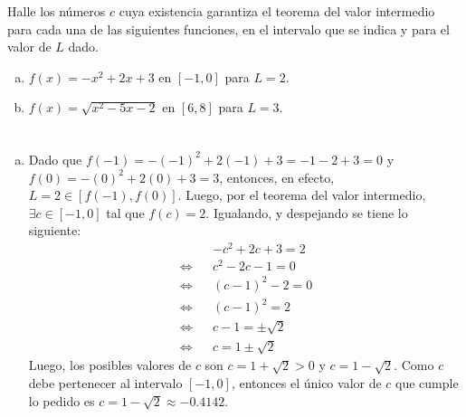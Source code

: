 \begin{enunciado}
 Halle los n\'umeros $c$ cuya existencia garantiza el teorema del valor intermedio para cada una de las siguientes funciones, en el intervalo que se indica y para el valor de $L$ dado.
 \begin{enumerate}[(a)]
  \item $f(x) = -x^2 +2x +3$ en $[-1,0]$ para $L=2$.
  
  \item $f(x)=\sqrt{x^2 -5x -2}$ en $[6,8]$ para $L=3$.
 \end{enumerate}
\end{enunciado}

\begin{solucion}
 $\phantom{0}$
 \begin{enumerate}[(a)]
  \item Dado que $f(-1) = -(-1)^2 + 2(-1) + 3 = -1-2+3 = 0$ y $f(0) = -(0)^2 + 2(0) + 3 = 3$, entonces, en efecto, $L = 2 \in [f(-1), f(0)]$. Luego, por el teorema del valor intermedio, $\exists c \in [-1,0]$ tal que $f(c) = 2$. Igualando, y despejando se tiene lo siguiente:
  \begin{eqnarray*}
   & & -c^2 + 2c + 3 = 2 \\
   \Leftrightarrow & & c^2 -2c - 1 = 0 \\ 
   \Leftrightarrow & & (c-1)^2 -2 = 0 \\
   \Leftrightarrow & & (c-1)^2 = 2 \\
   \Leftrightarrow & & c-1 = \pm \sqrt{2} \\
   \Leftrightarrow & & c = 1 \pm \sqrt{2}
  \end{eqnarray*}
  Luego, los posibles valores de $c$ son $c = 1+\sqrt{2} > 0$ y $c = 1 - \sqrt{2}$. Como $c$ debe pertenecer al intervalo $[-1, 0]$, entonces el \'unico valor de $c$ que cumple lo pedido es $c = 1-\sqrt{2}\approx -0.4142$.
  

\end{enumerate}
\end{solucion}
